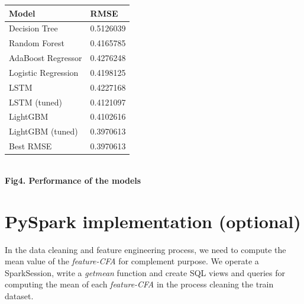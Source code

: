\documentclass{article}
\begin{document}
\begin{center} 
\centering
\begin{tabular}{ll}
\hline
Model & RMSE\\
\hline
Decision Tree & 0.5126039 \\
Random Forest & 0.4165785 \\
AdaBoost Regressor & 0.4276248 \\
Logistic Regression & 0.4198125 \\
LSTM & 0.4227168 \\
LSTM (tuned) & 0.4121097 \\
LightGBM & 0.4102616 \\
LightGBM (tuned) & 0.3970613 \\
Best RMSE & 0.3970613\\
\hline
\end{tabular}\\
\textbf{Fig4. Performance of the models}\\
\end{center}

\section{PySpark implementation (optional)}
In the data cleaning and feature engineering process, we need to compute the mean value of the \textit{feature-CFA} for complement purpose. We operate a SparkSession, write a \textit{getmean} function and create SQL views and queries for computing the mean of each \textit{feature-CFA} in the process cleaning the train dataset.
\end{document}
